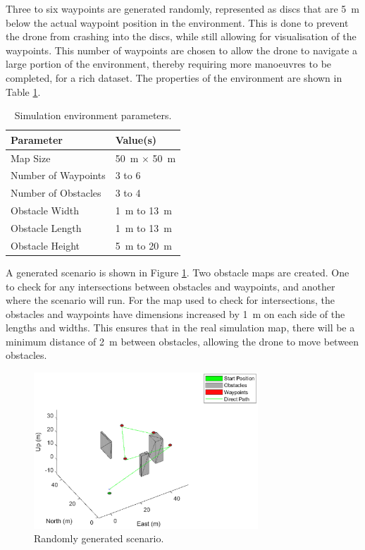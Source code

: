 Three to six waypoints are generated randomly, represented as discs that are \SI{5}{\meter} below the actual waypoint position in the environment. This is done to prevent the drone from crashing into the discs, while still allowing for visualisation of the waypoints. This number of waypoints are chosen to allow the drone to navigate a large portion of the environment, thereby requiring more manoeuvres to be completed, for a rich dataset. The properties of the environment are shown in Table \ref{tab:zain5}.
\begin{table}[H]
    \centering
    \begin{tabular}{@{}ll@{}}
        \toprule
        \textbf{Parameter} & \textbf{Value(s)}\\
        \midrule
        Map Size & \SI{50}{\meter} $\times$ \SI{50}{\meter} \\
        Number of Waypoints & 3 to 6\\
        Number of Obstacles & 3 to 4 \\
        Obstacle Width & \SI{1}{\meter} to \SI{13}{\meter}\\
        Obstacle Length & \SI{1}{\meter} to \SI{13}{\meter}\\
        Obstacle Height & \SI{5}{\meter} to \SI{20}{\meter}\\
        \bottomrule
    \end{tabular}
    \caption{Simulation environment parameters.}
    \label{tab:zain5}
\end{table}
 A generated scenario is shown in Figure \ref{fig:sim_pic_5}. Two obstacle maps are created. One to check for any intersections between obstacles and waypoints, and another where the scenario will run. For the map used to check for intersections, the obstacles and waypoints have dimensions increased by \SI{1}{\meter} on each side of the lengths and widths. This ensures that in the real simulation map, there will be a minimum distance of \SI{2}{\meter} between obstacles, allowing the drone to move between obstacles.
\begin{figure}[H]
    \centering
    \includegraphics[width = 0.75\textwidth]{./img/sim_pic_5.eps}
    \caption{Randomly generated scenario.}
    \label{fig:sim_pic_5}
\end{figure}
